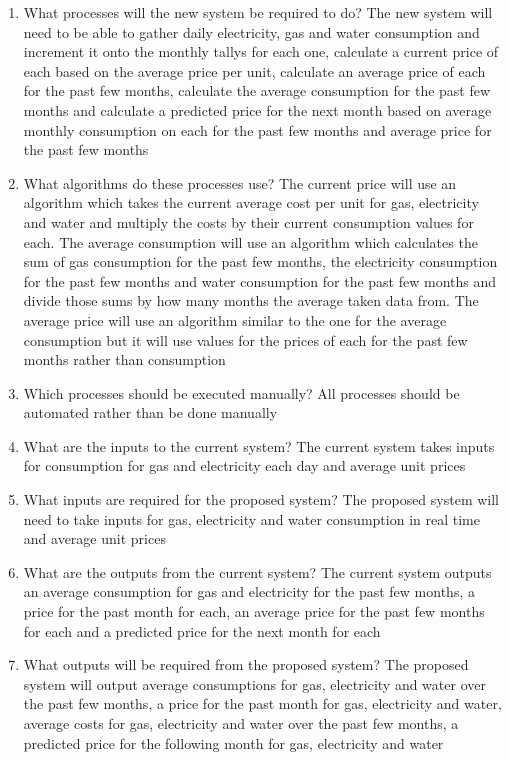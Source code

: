 \begin{enumerate}
	\item What processes will the new system be required to do?
The new system will need to be able to gather daily electricity, gas and water consumption and increment it onto the monthly tallys for each one, calculate a current price of each based on the average price per unit, calculate an average price of each for the past few months, calculate the average consumption for the past few months and calculate a predicted price for the next month based on average monthly consumption on each for the past few months and average price for the past few months

	\item What algorithms do these processes use?
The current price will use an algorithm which takes the current average cost per unit for gas, electricity and water and multiply the costs by their current consumption values for each.
The average consumption will use an algorithm which calculates the sum of gas consumption for the past few months, the electricity consumption for the past few months and water consumption for the past few months and divide those sums by how many months the average taken data from. 
The average price will use an algorithm similar to the one for the average consumption but it will use values for the prices of each for the past few months rather than consumption

	\item Which processes should be executed manually?
All processes should be automated rather than be done manually

	\item What are the inputs to the current system?
The current system takes inputs for consumption for gas and electricity each day and average unit prices

	\item What inputs are required for the proposed system?
The proposed system will need to take inputs for gas, electricity and water consumption in real time and average unit prices

	\item What are the outputs from the current system?
The current system outputs an average consumption for gas and electricity for the past few months, a price for the past month for each, an average price for the past few months for each and a predicted price for the next month for each

	\item What outputs will be required from the proposed system?
The proposed system will output average consumptions for gas, electricity and water over the past few months, a price for the past month for gas, electricity and water, average costs for gas, electricity and water over the past few months, a predicted price for the following month for gas, electricity and water

\end{enumerate}

